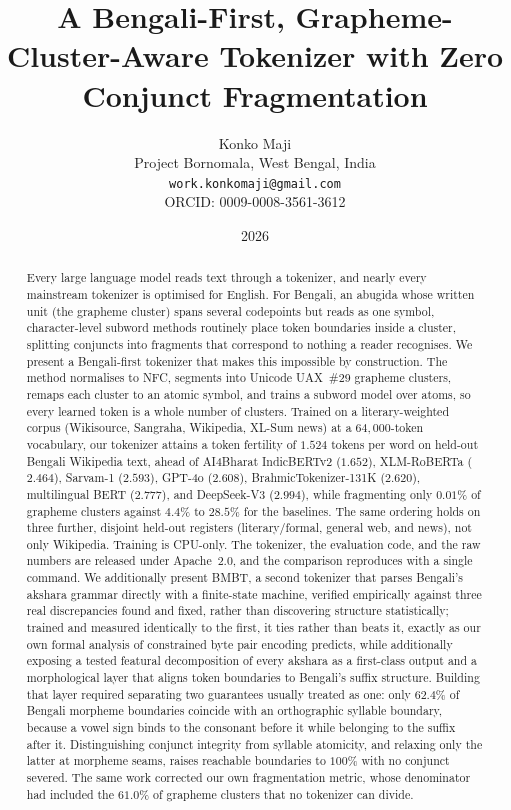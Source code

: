\documentclass[11pt]{article}
\title{\textbf{A Bengali-First, Grapheme-Cluster-Aware Tokenizer with Zero Conjunct Fragmentation}}
\author{
  Konko Maji \\
  Project Bornomala, West Bengal, India \\
  \texttt{work.konkomaji@gmail.com} \\
  ORCID: 0009-0008-3561-3612
}
\date{2026}
\begin{document}
\maketitle

\begin{abstract}
Every large language model reads text through a tokenizer, and nearly every
mainstream tokenizer is optimised for English. For Bengali, an abugida whose
written unit (the grapheme cluster) spans several codepoints but reads as one
symbol, character-level subword methods routinely place token boundaries inside
a cluster, splitting conjuncts into fragments that correspond to nothing a reader
recognises. We present a Bengali-first tokenizer that makes this impossible by
construction. The method normalises to NFC, segments into Unicode UAX~\#29
grapheme clusters, remaps each cluster to an atomic symbol, and trains a subword
model over atoms, so every learned token is a whole number of clusters. Trained
on a literary-weighted corpus (Wikisource, Sangraha, Wikipedia, XL-Sum news) at
a $64{,}000$-token vocabulary, our tokenizer attains a token fertility of
$1.524$ tokens per word on held-out Bengali Wikipedia text, ahead of AI4Bharat
IndicBERTv2 ($1.652$), XLM-RoBERTa ($2.464$), Sarvam-1 ($2.593$), GPT-4o
($2.608$), BrahmicTokenizer-131K ($2.620$), multilingual BERT ($2.777$), and
DeepSeek-V3 ($2.994$), while fragmenting only $0.01\%$ of grapheme clusters
against $4.4\%$ to $28.5\%$ for the baselines. The same ordering holds on three further, disjoint held-out
registers (literary/formal, general web, and news), not only Wikipedia. Training
is CPU-only. The tokenizer, the evaluation code, and the raw numbers are
released under Apache~2.0, and the comparison reproduces with a single command.
We additionally present BMBT, a second tokenizer that parses Bengali's
akshara grammar directly with a finite-state machine, verified empirically
against three real discrepancies found and fixed, rather than discovering
structure statistically; trained and measured identically to the first, it
ties rather than beats it, exactly as our own formal analysis of
constrained byte pair encoding predicts, while additionally exposing a
tested featural decomposition of every akshara as a first-class output and a
morphological layer that aligns token boundaries to Bengali's suffix
structure. Building that layer required separating two guarantees usually
treated as one: only $62.4\%$ of Bengali morpheme boundaries coincide with an
orthographic syllable boundary, because a vowel sign binds to the consonant
before it while belonging to the suffix after it. Distinguishing conjunct
integrity from syllable atomicity, and relaxing only the latter at morpheme
seams, raises reachable boundaries to $100\%$ with no conjunct severed. The
same work corrected our own fragmentation metric, whose denominator had
included the $61.0\%$ of grapheme clusters that no tokenizer can divide.
\end{abstract}
\end{document}
